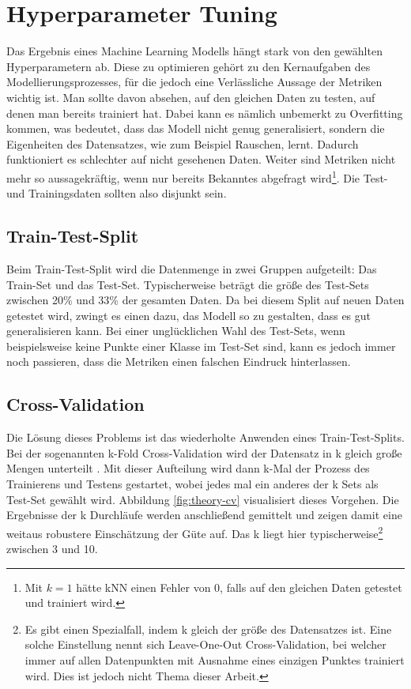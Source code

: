 \section{Hyperparameter Tuning \label{Section-HyperTuning}}

Das Ergebnis eines Machine Learning Modells hängt stark von den gewählten Hyperparametern ab. Diese zu
 optimieren gehört zu den Kernaufgaben des Modellierungsprozesses, für die jedoch eine Verlässliche Aussage
 der Metriken wichtig ist. Man sollte davon absehen, auf den gleichen Daten zu testen, auf denen man bereits
 trainiert hat. Dabei kann es nämlich unbemerkt zu Overfitting kommen, was bedeutet, dass das Modell nicht
 genug generalisiert, sondern die Eigenheiten des Datensatzes, wie zum Beispiel Rauschen, lernt. Dadurch
 funktioniert es schlechter auf nicht gesehenen Daten. Weiter sind Metriken nicht mehr so aussagekräftig,
 wenn nur bereits Bekanntes abgefragt wird\footnote{Mit $k=1$ hätte kNN einen Fehler von $0$, falls auf den
 gleichen Daten getestet und trainiert wird.}. Die Test- und Trainingsdaten sollten also disjunkt sein.

\subsection*{Train-Test-Split}

Beim Train-Test-Split wird die Datenmenge in zwei Gruppen aufgeteilt: Das Train-Set und das Test-Set.
 Typischerweise beträgt die größe des Test-Sets zwischen 20\% und 33\% der gesamten Daten. Da bei diesem Split
 auf neuen Daten getestet wird, zwingt es einen dazu, das Modell so zu gestalten, dass es gut generalisieren
 kann. Bei einer unglücklichen Wahl des Test-Sets, wenn beispielsweise keine Punkte einer Klasse im Test-Set sind,
 kann es jedoch immer noch passieren, dass die Metriken einen falschen Eindruck hinterlassen.

\subsection*{Cross-Validation}

Die Lösung dieses Problems ist das wiederholte Anwenden eines Train-Test-Splits. Bei der sogenannten
 k-Fold Cross-Validation wird der Datensatz in k gleich große Mengen unterteilt \cite{mlCV}. Mit dieser Aufteilung
 wird dann k-Mal der Prozess des Trainierens und Testens gestartet, wobei jedes mal ein anderes der k Sets als
 Test-Set gewählt wird. Abbildung \ref{fig:theory-cv} visualisiert dieses Vorgehen. Die Ergebnisse der k Durchläufe
 werden anschließend gemittelt und zeigen damit eine weitaus robustere Einschätzung der Güte auf. Das k liegt hier
 typischerweise\footnote{Es gibt einen Spezialfall, indem k gleich der größe des Datensatzes ist. Eine solche
 Einstellung nennt sich Leave-One-Out Cross-Validation, bei welcher immer auf allen Datenpunkten mit Ausnahme
 eines einzigen Punktes trainiert wird. Dies ist jedoch nicht Thema dieser Arbeit.} zwischen 3 und 10.

